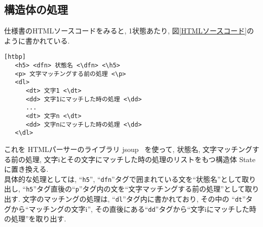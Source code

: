 \documentclass[uplatex,a4j]{jsreport}
\begin{document}
\subsection{構造体の処理}
仕様書のHTMLソースコードをみると, 1状態あたり, 図\ref{HTMLソースコード}のように書かれている. 
\begin{lstlisting}[basicstyle=\ttfamily\footnotesize, frame=single, caption=HTMLソースコード,label=HTMLソースコード][htbp]
   <h5> <dfn> 状態名 <\dfn> <\h5>
   <p> 文字マッチングする前の処理 <\p>
   <dl>
      <dt> 文字1 <\dt>
      <dd> 文字1にマッチした時の処理 <\dd>
      ...
      <dt> 文字n <\dt>
      <dd> 文字nにマッチした時の処理 <\dd>
   <\dl>
\end{lstlisting}
これを HTMLパーサーのライブラリ jsoup ~\cite{jsoup}を使って, 
状態名, 文字マッチングする前の処理, 文字iとその文字にマッチした時の処理のリストをもつ構造体 State に置き換える. \\
具体的な処理としては, 
``\texttt{h5}'', ``\texttt{dfn}''タグで囲まれている文を``状態名''として取り出し, 
``\texttt{h5}''タグ直後の``\texttt{p}''タグ内の文を``文字マッチングする前の処理''として取り出す.
文字のマッチングの処理は, ``\texttt{dl}''タグ内に書かれており, 
その中の ``\texttt{dt}''タグから``マッチングの文字i'', その直後にある``\texttt{dd}''タグから``文字iにマッチした時の処理''を取り出す.\\


\end{document}
